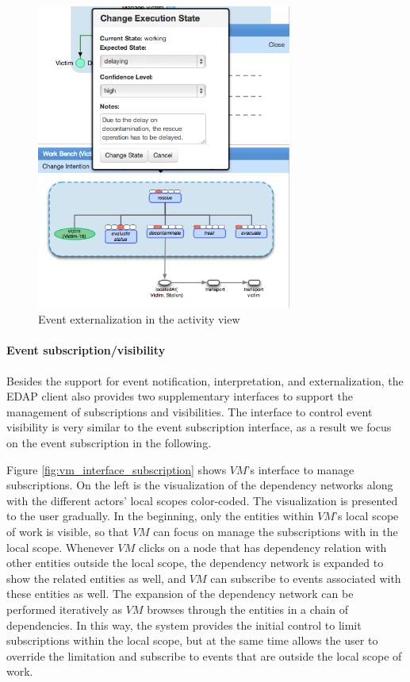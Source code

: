 \begin{figure}[htbp] %
	\centering
	\includegraphics[width=3.3in]{vm_interface_externalization.jpg} 
	\caption{Event externalization in the activity view}
	\label{fig:vm_interface_externalization}
\end{figure}

\paragraph*{Event subscription/visibility} %
\label{par:event_subscription}
Besides the support for event notification, interpretation, and externalization, the EDAP client also provides two supplementary interfaces to support the management of subscriptions and visibilities. The interface to control event visibility is very similar to the event subscription interface, as a result we focus on the event subscription in the following.

Figure \ref{fig:vm_interface_subscription} shows $VM$'s interface to manage subscriptions. On the left is the visualization of the dependency networks along with the different actors' local scopes color-coded. The visualization is presented to the user gradually. In the beginning, only the entities within $VM$'s local scope of work is visible, so that $VM$ can focus on manage the subscriptions with in the local scope. Whenever $VM$ clicks on a node that has dependency relation with other entities outside the local scope, the dependency network is expanded to show the related entities as well, and $VM$ can subscribe to events associated with these entities as well. The expansion of the dependency network can be performed iteratively as $VM$ browses through the entities in a chain of dependencies. In this way, the system provides the initial control to limit subscriptions within the local scope, but at the same time allows the user to override the limitation and subscribe to events that are outside the local scope of work.

